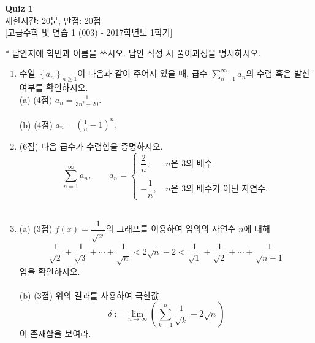 \documentclass{article}
\begin{document}
\begin{center}
\textbf{Quiz 1}\\
제한시간: 20분, 만점: 20점\\
{[고급수학 및 연습 1 (003) - 2017학년도 1학기]}\\
\end{center}

* 답안지에 학번과 이름을 쓰시오. 답안 작성 시 풀이과정을 명시하시오.

\begin{enumerate}
\item 수열 $\left\{ a_n \right\} _{n \geq 1}$이 다음과 같이 주어져 있을 때, 급수 $\displaystyle\sum\limits_{n=1}^{\infty}a_n$의 수렴 혹은 발산 여부를 확인하시오.
\\
(a) (4점) $\displaystyle a_n=\frac{1}{3n^2-20}$.
\\\\
(b) (4점) $\displaystyle a_n=\left(\frac{1}{n} - 1\right) ^n$.
\\

\item (6점) 다음 급수가 수렴함을 증명하시오.
\begin{equation*}
\sum_{n=1}^{\infty}a_n, \quad\quad a_n=\left\{
                \begin{array}{rl}
                  \dfrac{2}{n}, &\, n\text{은 }  3\text{의 배수}\\ \\
 			-\dfrac{1}{n}, &\, n\text{은 } 3\text{의 배수가 아닌 자연수.}
                \end{array}
              \right.
\end{equation*}
\\
\item (a) (3점) $f(x)=\dfrac{1}{\sqrt{x}}$의 그래프를 이용하여 임의의 자연수 $n$에 대해
$$\frac{1}{\sqrt{2}}+\frac{1}{\sqrt{3}}+\cdots+\frac{1}{\sqrt{n}}<2\sqrt{n}-2<\frac{1}{\sqrt{1}}+\frac{1}{\sqrt{2}}+\cdots+\frac{1}{\sqrt{n-1}}$$
임을 확인하시오.\\\\
(b) (3점) 위의 결과를 사용하여 극한값
$$\delta := \lim_{n \rightarrow \infty} \left(\sum_{k=1}^n \frac{1}{\sqrt{k}}-2\sqrt{n}\right)$$
이 존재함을 보여라.
\end{enumerate}
\end{document}
